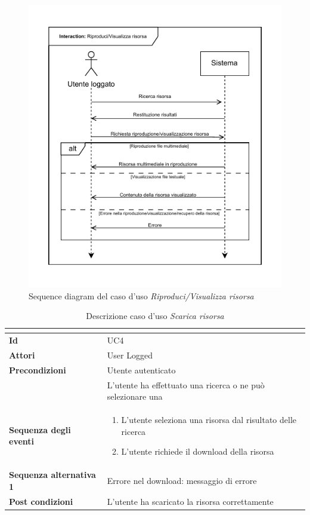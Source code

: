 \documentclass[a4paper]{article}
\begin{document}
\begin{figure}[H]
    \centering
    \includegraphics{./figures/visualizza_risorsa_sd}
    \caption{Sequence diagram del caso d'uso \textit{Riproduci/Visualizza risorsa}}
    \label{fig:sd_visualizza_risorsa}
\end{figure}

\begin{table}[H]
    \centering
    \renewcommand{\arraystretch}{1.5}
    \begin{tabular}{|>{\bfseries}l|p{10cm}|}
        \hline
        \multicolumn{2}{|c|}{\textbf{Caso d'uso: Scarica risorsa}} \\
        \hline
        \textbf{Id} & UC4 \\ \hline
        \textbf{Attori} & User Logged \\ \hline
        \textbf{Precondizioni} & Utente autenticato \\
        & L'utente ha effettuato una ricerca o ne può selezionare una \\ \hline
        \textbf{Sequenza degli eventi} &
        \begin{enumerate}
            \item L'utente seleziona una risorsa dal risultato delle ricerca
            \item L'utente richiede il download della risorsa
        \end{enumerate}\\ \hline
        \textbf{Sequenza alternativa 1} & Errore nel download: messaggio di errore \\ \hline
        \textbf{Post condizioni} & L'utente ha scaricato la risorsa correttamente \\ \hline
    \end{tabular}
    \caption{Descrizione caso d'uso \textit{Scarica risorsa}}
    \label{tab:download_resource-usecase}
\end{table}
\end{document}
